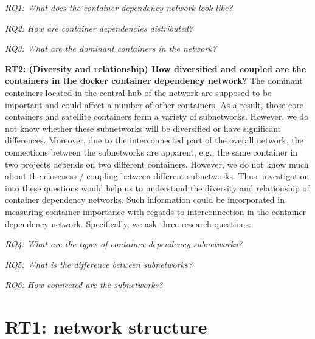 \documentclass[sigconf]{acmart}
\begin{document}



\emph{RQ1: What does the container dependency network look like?}

\emph{RQ2: How are container dependencies distributed?}

\emph{RQ3: What are the dominant containers in the network?}


\smallskip
\textbf{RT2: (Diversity and relationship) How diversified and coupled are the containers in the docker container dependency network?} 
The dominant containers located in the central hub of the network are supposed to be important and could affect a number of other containers. As a result, those core containers and satellite containers form a variety of subnetworks. 
However, we do not know whether these subnetworks will be diversified or have significant differences. 
Moreover, due to the interconnected part of the overall network, the connections between the subnetworks are apparent, e.g., the same container in two projects depends on two different containers. However, we do not know much about the closeness / coupling between different subnetworks. 
Thus, investigation into these questions would help us to understand the diversity and relationship of container dependency networks. Such information could be incorporated in measuring container importance with regards to interconnection in the container dependency network.  
Specifically, we ask three research questions:

\emph{RQ4: What are the types of container dependency subnetworks?}

\emph{RQ5: What is the difference between subnetworks?}

\emph{RQ6: How connected are the subnetworks?}




\section{RT1: network structure}
\label{sec:rt1}
\end{document}
